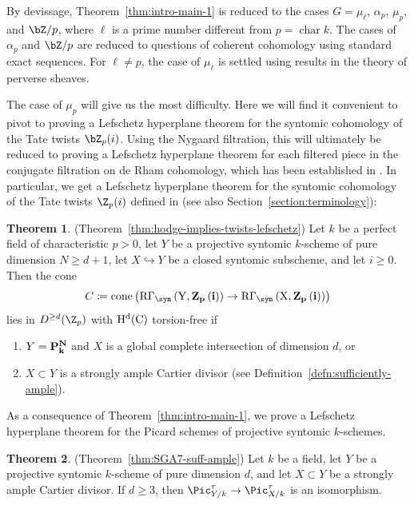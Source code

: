 \documentclass[11pt,reqno]{amsart}
\numberwithin{equation}{section}
\DeclareMathOperator{\charac}{char}
\theoremstyle{definition}
\newtheorem{thm}{Theorem}[subsection]
\begin{document}
By devissage, Theorem~\ref{thm:intro-main-1} is reduced to the cases $G = \mu_\ell,\, \alpha_p,\, \mu_p,$ and $\bZ/p$, where $\ell$ is a prime number different from $p=\charac k$. The cases of $\alpha_p$ and $\bZ/p$ are reduced to questions of coherent cohomology using standard exact sequences. For $\ell \neq p$, the case of $\mu_\ell$ is settled using results in the theory of perverse sheaves. \smallskip

The case of $\mu_p$ will give us the most difficulty. Here we will find it convenient to pivot to proving a Lefschetz hyperplane theorem for the  syntomic cohomology of the Tate twists $\bZ_p(i)$. Using the Nygaard filtration, this will ultimately be reduced to proving a Lefschetz hyperplane theorem for each filtered piece in the conjugate filtration on de Rham cohomology, which has been established in \cite{ABM}. In particular, we get a Lefschetz hyperplane theorem for the syntomic cohomology of the Tate twists $\Z_p(i)$ defined in \cite{BMS2} (see also Section~\ref{section:terminology}): \smallskip

\begin{thm}\label{thm:intro-main-2}(Theorem~\ref{thm:hodge-implies-twists-lefschetz}) Let $k$ be a perfect field of characteristic $p>0$, let $Y$ be a projective syntomic $k$-scheme of pure dimension $N\geq d+1$, let $X\hookrightarrow Y$ be a closed syntomic subscheme, and let $i \geq 0$. Then the cone 
\[
C \coloneqq \rm{cone}\left(\rm{R}\Gamma_\syn\left(Y, \bf{Z}_p\left(i\right)\right) \to \rm{R}\Gamma_\syn\left(X, \bf{Z}_p\left(i\right)\right)\right)
\]
lies in $D^{\geq d}(\Z_p)$ with $\rm{H}^d(C)$ torsion-free if
\begin{enumerate}
    \item $Y = \bf{P}^N_k$ and $X$ is a global complete intersection of dimension $d$, or
    \item $X\subset Y$ is a strongly ample Cartier divisor (see Definition~\ref{defn:sufficiently-ample}). 
\end{enumerate}
\end{thm}



As a consequence of Theorem~\ref{thm:intro-main-1}, we prove a Lefschetz hyperplane theorem for the Picard schemes of projective syntomic $k$-schemes.

\begin{thm}\label{thm:intro-main-5}(Theorem~\ref{thm:SGA7-suff-ample})
Let $k$ be a field, let $Y$ be a projective syntomic $k$-scheme of pure dimension $d$, and let $X \subset Y$ be a strongly ample Cartier divisor. If $d \geq 3$, then $\Pic^\tau_{Y/k} \to \Pic^\tau_{X/k}$ is an isomorphism.
\end{thm}
\end{document}
